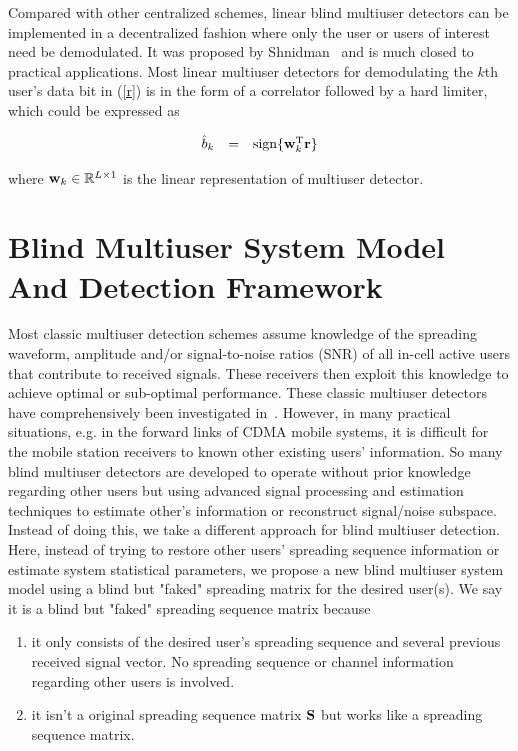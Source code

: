 \documentclass[a4paper,11pt,fleqn]{article}
\newcommand{\br}{{\mathbf r}}
\newcommand{\bw}{{\bf w}}
\newcommand{\bS}{{\bf S}}
\begin{document}
Compared with other centralized schemes, linear blind multiuser
detectors can be implemented in a decentralized fashion where only
the user or users of interest need be demodulated. It was proposed
by Shnidman~\cite{Shni67} and is much closed to practical
applications. Most linear multiuser detectors for demodulating the
$k$th user's data bit in (\ref{r}) is in the form of a correlator
followed by a hard limiter, which could be expressed as

\begin{equation}
\begin{array}{rcl}
\hat{b}_k &=& \mbox{sign}\{\bw_k^{\rm T}\br\}
\end{array} \label{linear}
\end{equation}

\noindent where $\bw_k \in \mathbb{R}^{L\times 1}$ is the linear
representation of multiuser detector.

\pagebreak

\section{Blind Multiuser System Model And Detection Framework\label{BMUD_model}}

Most classic multiuser detection schemes assume knowledge of the
spreading waveform, amplitude and/or signal-to-noise ratios (SNR)
of all in-cell active users that contribute to received signals.
These receivers then exploit this knowledge to achieve optimal or
sub-optimal performance. These classic multiuser detectors have
comprehensively been investigated in~\cite{Verd98}. However, in
many practical situations, e.g. in the forward links of CDMA
mobile systems, it is difficult for the mobile station receivers
to known other existing users' information. So many blind
multiuser detectors are developed to operate without prior
knowledge regarding other users but using advanced signal
processing and estimation techniques to estimate other's
information or reconstruct signal/noise subspace. Instead of doing
this, we take a different approach for blind multiuser detection.
Here, instead of trying to restore other users' spreading sequence
information or estimate system statistical parameters, we propose
a new blind multiuser system model using a blind but "faked"
spreading matrix for the desired user(s). We say it is a blind but
"faked" spreading sequence matrix because

\begin{enumerate}

\item it only consists of the desired user's spreading sequence
and several previous received signal vector. No spreading sequence
or channel information regarding other users is involved.

\item it isn't a original spreading sequence matrix $\bS$ but
works like a spreading sequence matrix.

\end{enumerate}
\end{document}
